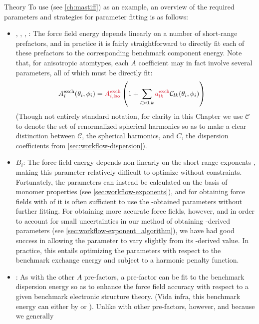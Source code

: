 \begin{subsection}{Theory}
To use \mastiff (see \cref{ch:mastiff}) as an example, an overview of the required parameters and
strategies for parameter fitting is as follows:
\begin{itemize}
\item \textcolor{fit}{, , , }: 
The force field energy depends linearly on a number of short-range prefactors, and
in practice it is fairly straightforward to directly fit each of these
prefactors to the corresponding benchmark \sapt component energy. Note that, for anisotropic atomtypes,
each $A$ coefficient may in fact involve several parameters, all of which must
be directly fit:
\begin{align}
\label{eq:pointer-anisotropy}
\Aex{i}(\theta_i,\phi_i) &=
\textcolor{fit}{\Aex{i,\text{iso}}}\left(1 + 
\sum\limits_{l>0,k} \textcolor{fit}{\aex}  \mathcal{C}_{lk}(\theta_i,\phi_i)
\right)
\end{align}
(Though not entirely standard notation,\cite{stone2013theory}
for clarity in this Chapter we use
$\mathcal{C}$ to denote the set of renormalized spherical harmonics so as to
make a clear distinction between $\mathcal{C}$, the spherical harmonics, and
$C$, the dispersion coefficients from \cref{sec:workflow-dispersion}).
%
\item \textcolor{cfit}{$B_i$}:
The force field energy depends non-linearly on the short-range exponents \B,
making this parameter relatively difficult to optimize without constraints.
Fortunately, the \B parameters can
instead be calculated on the basis of monomer properties (see
\cref{sec:workflow-exponents}), and for obtaining force fields with
\rmse of  it is often sufficient to use the \isa-obtained \B
parameters without further fitting. For obtaining more accurate force fields,
however, and in order to account for small uncertainties in our method of
obtaining \isa-derived \B parameters (see
\cref{sec:workflow-exponent_algorithm}), we have had good success in allowing the
\B parameter to vary slightly from its \isa-derived value. In practice, this entails
optimizing the \B parameters with respect to the benchmark \sapt exchange energy and subject
to a harmonic penalty function.\cite{Misquitta2016}
%
\item \textcolor{cfit}{}:
As with the other $A$ pre-factors, a pre-factor can be fit to the benchmark dispersion
energy so as to enhance the force field accuracy with respect to a given
benchmark electronic structure theory. (Vida infra, this benchmark energy can
either by \dftsapt or \ccsdt). Unlike with other pre-factors, however, and because we generally

\end{itemize}
\end{subsection}
